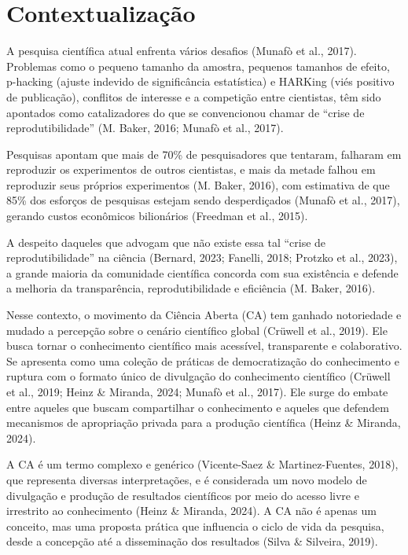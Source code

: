 \documentclass[
  a4paper,
]{book}
\begin{document}
\section{Contextualização}\label{contextualizauxe7uxe3o}

A pesquisa científica atual enfrenta vários desafios (Munafò et al.,
2017). Problemas como o pequeno tamanho da amostra, pequenos tamanhos de
efeito, p-hacking (ajuste indevido de significância estatística) e
HARKing (viés positivo de publicação), conflitos de interesse e a
competição entre cientistas, têm sido apontados como catalizadores do
que se convencionou chamar de ``crise de reprodutibilidade'' (M. Baker,
2016; Munafò et al., 2017).

Pesquisas apontam que mais de 70\% de pesquisadores que tentaram,
falharam em reproduzir os experimentos de outros cientistas, e mais da
metade falhou em reproduzir seus próprios experimentos (M. Baker, 2016),
com estimativa de que 85\% dos esforços de pesquisas estejam sendo
desperdiçados (Munafò et al., 2017), gerando custos econômicos
bilionários (Freedman et al., 2015).

A despeito daqueles que advogam que não existe essa tal ``crise de
reprodutibilidade'' na ciência (Bernard, 2023; Fanelli, 2018; Protzko et
al., 2023), a grande maioria da comunidade científica concorda com sua
existência e defende a melhoria da transparência, reprodutibilidade e
eficiência (M. Baker, 2016).

Nesse contexto, o movimento da Ciência Aberta (CA) tem ganhado
notoriedade e mudado a percepção sobre o cenário científico global
(Crüwell et al., 2019). Ele busca tornar o conhecimento científico mais
acessível, transparente e colaborativo. Se apresenta como uma coleção de
práticas de democratização do conhecimento e ruptura com o formato único
de divulgação do conhecimento científico (Crüwell et al., 2019; Heinz \&
Miranda, 2024; Munafò et al., 2017). Ele surge do embate entre aqueles
que buscam compartilhar o conhecimento e aqueles que defendem mecanismos
de apropriação privada para a produção científica (Heinz \& Miranda,
2024).

A CA é um termo complexo e genérico (Vicente-Saez \& Martinez-Fuentes,
2018), que representa diversas interpretações, e é considerada um novo
modelo de divulgação e produção de resultados científicos por meio do
acesso livre e irrestrito ao conhecimento (Heinz \& Miranda, 2024). A CA
não é apenas um conceito, mas uma proposta prática que influencia o
ciclo de vida da pesquisa, desde a concepção até a disseminação dos
resultados (Silva \& Silveira, 2019).
\end{document}
